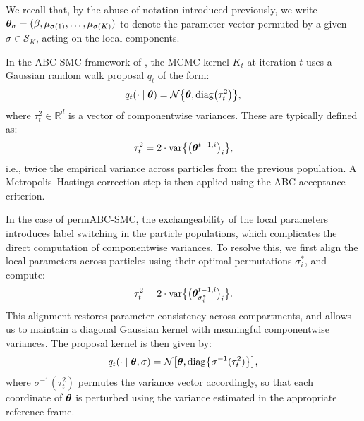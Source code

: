 We recall that, by the abuse of notation introduced previously, we write \( \boldsymbol{\theta}_\sigma = (\beta, \mu_{\sigma(1)}, \dots, \mu_{\sigma(K)}) \) to denote the parameter vector permuted by a given \( \sigma \in \mathcal{S}_K \), acting on the local components.


In the ABC-SMC framework of \citet{delmoralAdaptiveSequentialMonte2012}, the MCMC kernel \( K_t \) at iteration \( t \) uses a Gaussian random walk proposal \( q_t \) of the form:
\[
q_t(\cdot \mid \boldsymbol{\theta}) = \mathcal{N}\bigl\{\boldsymbol{\theta}, \operatorname{diag}\bigl(\tau_t^2\bigr)\bigr\},
\]
where \( \tau_t^2 \in \mathbb{R}^d \) is a vector of componentwise variances. These are typically defined as:
\[
\tau_t^2 = 2 \cdot \operatorname{var}\bigl\{\bigl(\boldsymbol{\theta}^{t-1,i}\bigr)_i\bigr\},
\]
i.e., twice the empirical variance across particles from the previous population. A Metropolis–Hastings correction step is then applied using the ABC acceptance criterion.

In the case of permABC-SMC, the exchangeability of the local parameters introduces label switching in the particle populations, which complicates the direct computation of componentwise variances. To resolve this, we first align the local parameters across particles using their optimal permutations \( \sigma_i^* \), and compute:
\[
\tau_t^2 = 2 \cdot \operatorname{var}\bigl\{\bigl(\boldsymbol{\theta}_{\sigma_i^*}^{t-1,i}\bigr)_i\bigr\}.
\]
This alignment restores parameter consistency across compartments, and allows us to maintain a diagonal Gaussian kernel with meaningful componentwise variances. The proposal kernel is then given by:
\[
q_t(\cdot \mid \boldsymbol{\theta}, \sigma) = \mathcal{N}\bigl[\boldsymbol{\theta}, \operatorname{diag}\bigl\{\sigma^{-1}(\tau_t^2)\bigr\}\bigr],
\]
where \( \sigma^{-1}(\tau_t^2) \) permutes the variance vector accordingly, so that each coordinate of \( \boldsymbol{\theta} \) is perturbed using the variance estimated in the appropriate reference frame.

